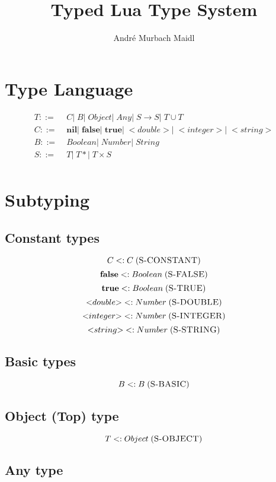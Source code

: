 \documentclass[12pt]{article}
\title{Typed Lua Type System}
\author{André Murbach Maidl}
\newcommand{\mylabel}[1]{\; (\textsc{#1})}
\newcommand{\subtype}{<:}
\newcommand{\pipe}{|\;}
\begin{document}
\maketitle

\section{Type Language}

\begin{align*}
T ::= \; & C \pipe B \pipe Object \pipe Any \pipe
S \rightarrow S \pipe T \cup T\\
C ::= \; & \mathbf{nil} \pipe \mathbf{false} \pipe \mathbf{true}
\pipe {<}double{>} \pipe {<}integer{>} \pipe {<}string{>}\\
B ::= \; & Boolean \pipe Number \pipe String\\
S ::= \; & T \pipe {T*} \pipe T \times S\\ 
\end{align*}

\section{Subtyping}

\subsection{Constant types}

\[
C \subtype C
\mylabel{S-CONSTANT}
\]
\[
\mathbf{false} \subtype Boolean
\mylabel{S-FALSE}
\]
\[
\mathbf{true} \subtype Boolean
\mylabel{S-TRUE}
\]
\[
{<}double{>} \subtype Number
\mylabel{S-DOUBLE}
\]
\[
{<}integer{>} \subtype Number
\mylabel{S-INTEGER}
\]
\[
{<}string{>} \subtype Number
\mylabel{S-STRING}
\]

\subsection{Basic types}

\[
B \subtype B
\mylabel{S-BASIC}
\]

\subsection{Object (Top) type}

\[
T \subtype Object
\mylabel{S-OBJECT}
\]

\subsection{Any type}
\end{document}
